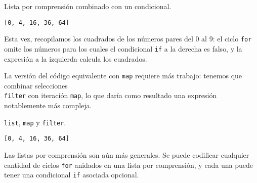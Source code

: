 \begin{code} Lista por comprensión combinado con un condicional.

\begin{Shaded}
\begin{Highlighting}[]
\NormalTok{[x}\OperatorTok{**}  \NormalTok{(}\NormalTok{) }\OperatorTok{\%}\OperatorTok{==}\NormalTok{]}
\end{Highlighting}
\end{Shaded}

\begin{verbatim}
[0, 4, 16, 36, 64]
\end{verbatim}
\end{code}

Esta vez, recopilamos los cuadrados de los números pares del 0 al 9: el
ciclo \texttt{for} omite los números para los cuales el condicional
\texttt{if} a la derecha es falso, y la expresión a la izquierda calcula
los cuadrados.

La versión del código equivalente con \texttt{map} requiere más trabajo:
tenemos que combinar selecciones\\
\texttt{filter} con iteración \texttt{map}, lo que daría como resultado
una expresión notablemente más compleja. \\

\begin{code} \texttt{list}, \texttt{map} y \texttt{filter}.

\begin{Shaded}
\begin{Highlighting}[]
\NormalTok{(}\NormalTok{(}\OperatorTok{**}\NormalTok{, }\NormalTok{(}\OperatorTok{\%}\OperatorTok{==}\NormalTok{, }\NormalTok{(}\NormalTok{))))}
\end{Highlighting}
\end{Shaded}

\begin{verbatim}
[0, 4, 16, 36, 64]
\end{verbatim}
\end{code}

Las listas por comprensión son aún más generales. Se puede codificar
cualquier cantidad de ciclos \texttt{for} anidados en una lista por
comprensión, y cada una puede tener una condicional \texttt{if} asociada
opcional.

